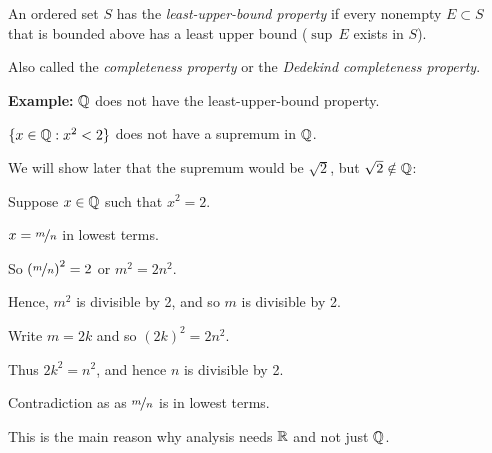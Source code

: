 \documentclass[10pt,aspectratio=169]{beamer}
\begin{document}
\begin{frame}

\begin{definition}
An ordered set $S$ has the \emph{least-upper-bound property} if
every nonempty
$E \subset S$ that is bounded above has a least upper bound
($\sup\, E$ exists in $S$).
\end{definition}

\pause

Also called the \emph{completeness property} or the
\emph{Dedekind completeness property}.

\medskip
\pause

\textbf{Example:}
${\mathbb{Q}}$ does not have the least-upper-bound property.

\pause
\medskip

$\{ x \in {\mathbb{Q}} : x^2 < 2 \}$ does not have a supremum in ${\mathbb{Q}}$.

\medskip
\pause

We will show later that the supremum would be $\sqrt{2}$, but $\sqrt{2}
\notin {\mathbb{Q}}$:

\medskip
\pause

Suppose $x \in {\mathbb{Q}}$ such that $x^2 = 2$.
\pause

$x=\nicefrac{m}{n}$ in lowest terms.

\pause

So ${(\nicefrac{m}{n})}^2 = 2$ or $m^2 = 2n^2$.

\pause

Hence, $m^2$ is divisible by 2, and so $m$ is divisible by 2.

\pause

Write $m = 2k$ and so ${(2k)}^2 = 2n^2$.

\pause
Thus $2k^2 = n^2$, and hence $n$ is divisible by 2.

\pause

Contradiction as  as $\nicefrac{m}{n}$ is in lowest terms.

\medskip
\pause

This is the main reason why analysis needs ${\mathbb{R}}$ and not just ${\mathbb{Q}}$.

\end{frame}
\end{document}
